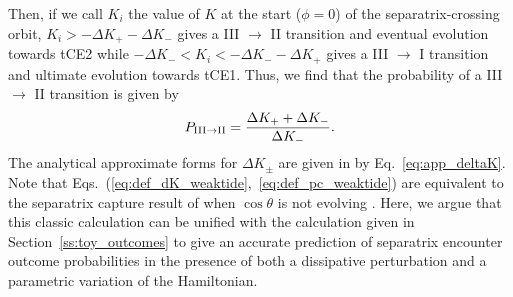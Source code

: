 \documentclass[
        fleqn,
        usenatbib,
    ]{mnras}
\begin{document}
Then, if we call $K_i$ the value of $K$ at the start ($\phi = 0$) of the
separatrix-crossing orbit, $K_i > -\Delta K_+ - \Delta K_-$ gives a III
$\to$ II transition and eventual evolution towards tCE2 while $-\Delta K_- < K_i
< -\Delta K_- - \Delta K_+$ gives a III $\to$ I transition and ultimate
evolution towards tCE1. Thus, we find that the probability of a III $\to$ II
transition is given by
\begin{equation}
    P_{\rm III \to II} = \frac{\Delta K_+ + \Delta K_-}{\Delta
        K_-}.\label{eq:def_pc_weaktide}
\end{equation}
The analytical approximate forms for $\Delta K_{\pm}$ are given in by
Eq.~\eqref{eq:app_deltaK}. Note that
Eqs.~(\ref{eq:def_dK_weaktide},~\ref{eq:def_pc_weaktide}) are equivalent to the
separatrix capture result of \citet{henrard1982} when $\cos \theta$ is not
evolving \citep{henrard1987}. Here, we argue that this classic calculation can
be unified with the calculation given in Section~\ref{ss:toy_outcomes} to give
an accurate prediction of separatrix encounter outcome probabilities in the
presence of both a dissipative perturbation and a parametric variation of the
Hamiltonian.
\end{document}
